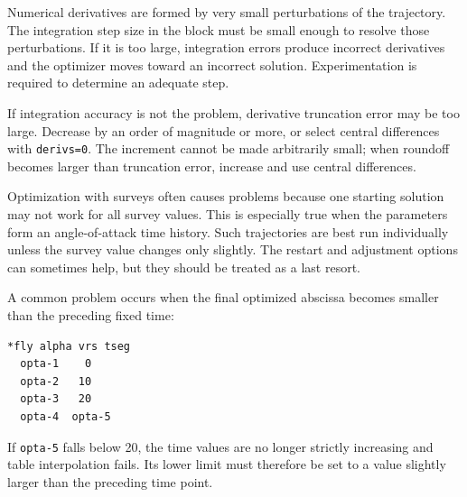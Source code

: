 
Numerical derivatives are formed by very small perturbations of the trajectory.  The
integration step size in the  block must be small enough to
resolve those perturbations.  If it is too large, integration errors produce incorrect
derivatives and the optimizer moves toward an incorrect solution.  Experimentation
is required to determine an adequate step.

If integration accuracy is not the problem, derivative truncation error may be too
large.  Decrease  by an order of magnitude or more, or select central
differences with \texttt{derivs=0}.  The increment cannot be made arbitrarily small;
when roundoff becomes larger than truncation error, increase  and use
central differences.


Optimization with surveys often causes problems because one starting solution may
not work for all survey values.  This is especially true when the parameters form an
angle-of-attack time history.  Such trajectories are best run individually unless the
survey value changes only slightly.  The restart and adjustment options can
sometimes help, but they should be treated as a last resort.


A common problem occurs when the final optimized abscissa becomes smaller than
the preceding fixed time:

\begin{lstlisting}[style=taosmanual]
*fly alpha vrs tseg
  opta-1    0
  opta-2   10
  opta-3   20
  opta-4  opta-5
\end{lstlisting}

If \texttt{opta-5} falls below 20, the time values are no longer strictly increasing and
table interpolation fails.  Its lower limit must therefore be set to a value slightly
larger than the preceding time point.
